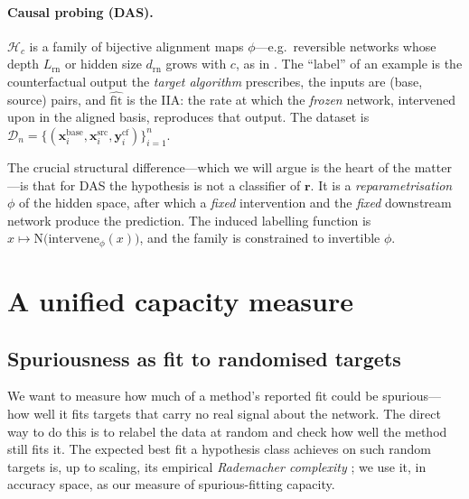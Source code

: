 \documentclass[11pt]{article}
\newcommand{\hypclass}{\mathcal{H}}      %
\newcommand{\complexity}{c}              %
\newcommand{\fit}{\mathrm{fit}}
\begin{document}
\paragraph{Causal probing (DAS).} $\hypclass_{\complexity}$ is a family of bijective
alignment maps $\phi$---e.g.\ reversible networks
\citep{gomez2017reversible} whose depth $L_{\mathrm{rn}}$ or hidden size
$d_{\mathrm{rn}}$ grows with $\complexity$, as in \citet{sutter2025nonlinear}. The
``label'' of an example is the counterfactual output the \emph{target algorithm}
prescribes, the inputs are (base, source) pairs, and $\widehat{\fit}$ is the IIA:
the rate at which the \emph{frozen} network, intervened upon in the aligned basis,
reproduces that output. The dataset is
$\mathcal{D}_n = \{(\mathbf x^{\mathrm{base}}_i, \mathbf x^{\mathrm{src}}_i,
\mathbf y^{\mathrm{cf}}_i)\}_{i=1}^n$.

The crucial structural difference---which we will argue is the heart of the
matter---is that for DAS the hypothesis is not a classifier of $\mathbf r$. It is a
\emph{reparametrisation} $\phi$ of the hidden space, after which a \emph{fixed}
intervention and the \emph{fixed} downstream network produce the prediction. The
induced labelling function is $x \mapsto \mathrm{N}\!\big(\mathrm{intervene}_\phi(x)\big)$,
and the family is constrained to invertible $\phi$.

\section{A unified capacity measure}\label{sec:measure}

\subsection{Spuriousness as fit to randomised targets}

We want to measure how much of a method's reported fit could be spurious---how well
it fits targets that carry no real signal about the network. The direct way to do
this is to relabel the data at random and check how well the method still fits it.
The expected best fit a hypothesis class achieves on such random targets is, up to
scaling, its empirical \emph{Rademacher complexity} \citep{bartlett2002rademacher};
we use it, in accuracy space, as our measure of spurious-fitting capacity.
\end{document}
